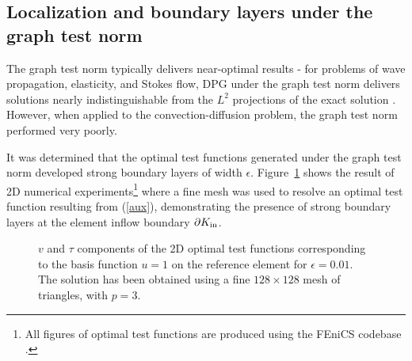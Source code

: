 \documentclass[11pt,onecolumn]{scrartcl}
\begin{document}
\subsection{Localization and boundary layers under the graph test norm}

The graph test norm typically delivers near-optimal results - for problems of wave propagation, elasticity, and Stokes flow, DPG under the graph test norm delivers solutions nearly indistinguishable from the $L^2$ projections of the exact solution \cite{DPG4, DPGElas, stokesDPG}.  However, when applied to the convection-diffusion problem, the graph test norm performed very poorly.

It was determined that the optimal test functions generated under the graph test norm developed strong boundary layers of width $\epsilon$.  Figure~\ref{fig:optTestBoundary} shows the result of 2D numerical experiments\footnote{All figures of optimal test functions are produced using the FEniCS codebase \cite{LoggMardalEtAl2012a}.} where a fine mesh was used to resolve an optimal test function resulting from (\ref{aux}), demonstrating the presence of strong boundary layers at the element inflow boundary $\partial K_{\rm in}$.  

\begin{figure}[!h]
\centering
{}
\caption{$v$ and $\tau$ components of the 2D optimal test functions corresponding to the basis function $u=1$ on the reference element for $\epsilon = 0.01$. The solution has been obtained using a fine $128\times128$ mesh of triangles, with $p = 3$. }
\label{fig:optTestBoundary}
\end{figure}
\end{document}
